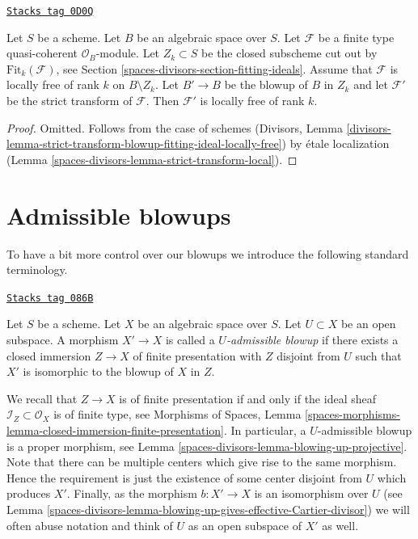 \begin{lemma}
\label{spaces-divisors-lemma-strict-transform-blowup-fitting-ideal-locally-free}
\href{https://stacks.math.columbia.edu/tag/0D0Q}{\texttt{Stacks tag 0D0Q}}

Let $S$ be a scheme. Let $B$ be an algebraic space over $S$.
Let $\mathcal{F}$ be a finite type quasi-coherent $\mathcal{O}_B$-module.
Let $Z_k \subset S$ be the closed subscheme cut out by
$\text{Fit}_k(\mathcal{F})$, see Section \ref{spaces-divisors-section-fitting-ideals}.
Assume that $\mathcal{F}$ is locally free of rank $k$ on $B \setminus Z_k$.
Let $B' \to B$ be the blowup of $B$ in $Z_k$ and let
$\mathcal{F}'$ be the strict transform of $\mathcal{F}$.
Then $\mathcal{F}'$ is locally free of rank $k$.
\end{lemma}

\begin{proof}
Omitted. Follows from the case of schemes
(Divisors, Lemma
\ref{divisors-lemma-strict-transform-blowup-fitting-ideal-locally-free})
by \'etale localization (Lemma \ref{spaces-divisors-lemma-strict-transform-local}).
\end{proof}

\section{Admissible blowups}
\label{spaces-divisors-section-admissible-blowups}
To have a bit more control over our blowups we introduce the following
standard terminology.

\begin{definition}
\label{spaces-divisors-definition-admissible-blowup}
\href{https://stacks.math.columbia.edu/tag/086B}{\texttt{Stacks tag 086B}}

Let $S$ be a scheme. Let $X$ be an algebraic space over $S$.
Let $U \subset X$ be an open subspace. A morphism
$X' \to X$ is called a {\it $U$-admissible blowup} if there exists a
closed immersion $Z \to X$ of finite presentation with $Z$ disjoint from
$U$ such that $X'$ is isomorphic to the blowup of $X$ in $Z$.
\end{definition}

We recall that $Z \to X$ is of finite presentation if and only if the
ideal sheaf $\mathcal{I}_Z \subset \mathcal{O}_X$ is of finite type, see
Morphisms of Spaces, Lemma
\ref{spaces-morphisms-lemma-closed-immersion-finite-presentation}.
In particular, a $U$-admissible blowup is a proper morphism, see
Lemma \ref{spaces-divisors-lemma-blowing-up-projective}.
Note that there can be multiple centers which give rise to the same morphism.
Hence the requirement is just the existence of some center disjoint from
$U$ which produces $X'$.
Finally, as the morphism $b : X' \to X$ is an isomorphism over $U$ (see
Lemma \ref{spaces-divisors-lemma-blowing-up-gives-effective-Cartier-divisor}) we will often
abuse notation and think of $U$ as an open subspace of $X'$ as well.

